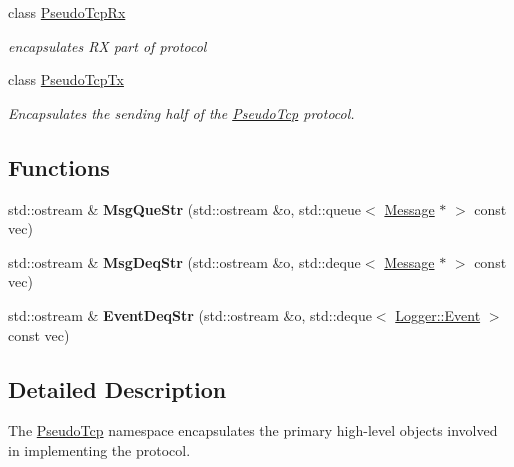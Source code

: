\begin{DoxyCompactItemize}
class \hyperlink{classPseudoTcp_1_1PseudoTcpRx}{PseudoTcpRx}
\begin{DoxyCompactList}\small\item\em encapsulates RX part of protocol \item\end{DoxyCompactList}\item 
class \hyperlink{classPseudoTcp_1_1PseudoTcpTx}{PseudoTcpTx}
\begin{DoxyCompactList}\small\item\em Encapsulates the sending half of the \hyperlink{namespacePseudoTcp}{PseudoTcp} protocol. \item\end{DoxyCompactList}\end{DoxyCompactItemize}
\subsection*{Functions}
\begin{DoxyCompactItemize}
\item 
\hypertarget{namespacePseudoTcp_a10b946efa69f13c33185c8f649de35b3}{
std::ostream \& {\bfseries MsgQueStr} (std::ostream \&o, std::queue$<$ \hyperlink{classPseudoTcp_1_1Message}{Message} $\ast$ $>$ const vec)}
\label{namespacePseudoTcp_a10b946efa69f13c33185c8f649de35b3}

\item 
\hypertarget{namespacePseudoTcp_ac9af1ba494def4141d86f496cfac163f}{
std::ostream \& {\bfseries MsgDeqStr} (std::ostream \&o, std::deque$<$ \hyperlink{classPseudoTcp_1_1Message}{Message} $\ast$ $>$ const vec)}
\label{namespacePseudoTcp_ac9af1ba494def4141d86f496cfac163f}

\item 
\hypertarget{namespacePseudoTcp_a722918fd3d524ed82ffcccd03988c29d}{
std::ostream \& {\bfseries EventDeqStr} (std::ostream \&o, std::deque$<$ \hyperlink{classLogger_1_1Event}{Logger::Event} $>$ const vec)}
\label{namespacePseudoTcp_a722918fd3d524ed82ffcccd03988c29d}

\end{DoxyCompactItemize}


\subsection{Detailed Description}
The \hyperlink{namespacePseudoTcp}{PseudoTcp} namespace encapsulates the primary high-\/level objects involved in implementing the protocol. 